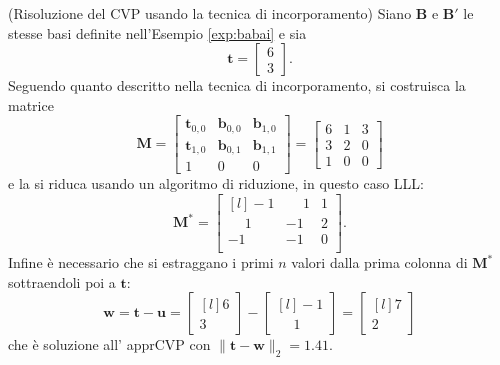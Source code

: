 \begin{exmp}(Risoluzione del CVP usando la tecnica di incorporamento)
Siano $\mathbf{B}$ e $\mathbf{B}'$ le stesse basi definite nell'Esempio \ref*{exp:babai} e
sia
\[
    \mathbf{t} =
    \begin{bmatrix}
        6\\
        3
    \end{bmatrix}.
\]
Seguendo quanto descritto nella tecnica di incorporamento, si costruisca la matrice 
\[
    \mathbf{M} =
    \begin{bmatrix}
        \mathbf{t}_{0,0} & \mathbf{b}_{0,0} & \mathbf{b}_{1,0}\\
        \mathbf{t}_{1,0} & \mathbf{b}_{0,1} & \mathbf{b}_{1,1}\\
        1 & 0 & 0
    \end{bmatrix}
    =
    \begin{bmatrix}
        6 & 1 & 3 \\
        3 & 2 & 0 \\
        1 & 0 & 0 
    \end{bmatrix}
\]
e la si riduca usando un algoritmo di riduzione, in questo caso LLL:
\begin{equation*}
    \mathbf{M}^* =
    \begin{bmatrix*}[l]
        -1           & \phantom{-}1 & 1\\
        \phantom{-}1 & -1           & 2 \\
        -1           & -1           & 0\\
    \end{bmatrix*}.
\end{equation*}
Infine è necessario che si estraggano i primi $n$ valori dalla prima colonna di $\mathbf{M}^*$
sottraendoli poi a $\mathbf{t}$:
\begin{equation*}
    \mathbf{w} = \mathbf{t} - \mathbf{u} =
    \begin{bmatrix*}[l]
        6 \\
        3
    \end{bmatrix*}
    -
    \begin{bmatrix*}[l]
        -1 \\
        \phantom{-}1
    \end{bmatrix*}
    =
    \begin{bmatrix*}[l]
        7 \\
        2
    \end{bmatrix*}
\end{equation*}
che è soluzione all' apprCVP con $\|\mathbf{t}-\mathbf{w}\|_2=1.41$.

\end{exmp}
